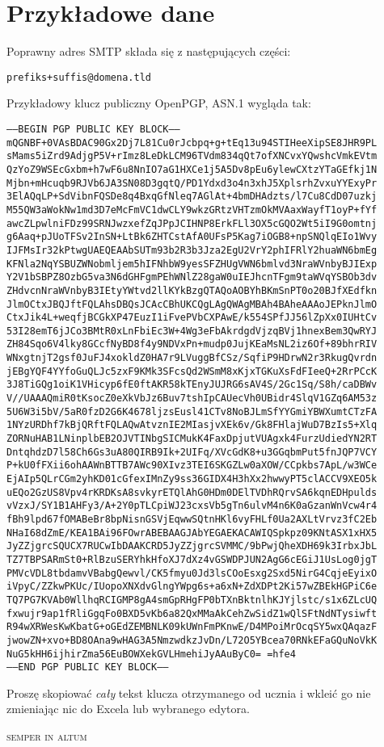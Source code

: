 \section{Przykładowe dane}

Poprawny adres SMTP składa się z następujących części:
\begin{center}\texttt{prefiks+suffis@domena.tld}\end{center}

\noindent Przykładowy klucz publiczny OpenPGP, ASN.1 wygląda tak:
\begin{center}\tiny
\texttt{-----BEGIN PGP PUBLIC KEY BLOCK-----\\
mQGNBF+0VAsBDAC90Gx2Dj7L81Cu0rJcbpq+g+tEq13u94STIHeeXipSE8JHR9PL
sMams5iZrd9AdjgP5V+rImz8LeDkLCM96TVdm834qQt7ofXNCvxYQwshcVmkEVtm
QzYoZ9WSEcGxbm+h7wF6u8NnIO7aG1HXCe1j5A5Dv8pEu6ylewCXtzYTaGEfkj1N
Mjbn+mHcuqb9RJVb6JA3SN08D3gqtQ/PD1Ydxd3o4n3xhJ5XplsrhZvxuYYExyPr
3ElAQqLP+SdVibnFQSDe8q4BxqGfNleq7AGlAt+4bmDHAdzts/l7Cu8CdD07uzkj
M55QW3aWokNw1md3D7eMcFmVC1dwCLY9wkzGRtzVHTzmOkMVAaxWayfT1oyP+fYf
awcZLpwlniFDz99SRNJwzxefZqJPpJCIHNP8ErkFLl3OX5cGQO2Wt5iI9G0omtnj
g6Aaq+pJUoTFSv2InSN+LtBk6ZHTCstAfA0UFsP5Kag7iOGB8+npSNQlqEIo1Wvy
IJFMsIr32kPtwgUAEQEAAbSUTm93b2R3b3Jza2EgU2VrY2phIFRlY2huaWN6bmEg
KFNla2NqYSBUZWNobmljem5hIFNhbW9yesSFZHUgVWN6bmlvd3NraWVnbyBJIExp
Y2V1bSBPZ8OzbG5va3N6dGHFgmPEhWNlZ28gaW0uIEJhcnTFgm9taWVqYSBOb3dv
ZHdvcnNraWVnbyB3IEtyYWtvd2llKYkBzgQTAQoAOBYhBKmSnPT0o20BJfXEdfkn
JlmOCtxJBQJftFQLAhsDBQsJCAcCBhUKCQgLAgQWAgMBAh4BAheAAAoJEPknJlmO
CtxJik4L+weqfjBCGkXP47EuzI1iFvePVbCXPAwE/k554SPfJJ56lZpXx0IUHtCv
53I28emT6jJCo3BMtR0xLnFbiEc3W+4Wg3eFbAkrdgdVjzqBVj1hnexBem3QwRYJ
ZH84Sqo6V4lky8GCcfNyBD8f4y9NDVxPn+mudp0JujKEaMsNL2iz6Of+89bhrRIV
WNxgtnjT2gsf0JuFJ4xokldZ0HA7r9LVuggBfCSz/SqfiP9HDrwN2r3RkugQvrdn
jEBgYQF4YYfoGuQLJc5zxF9KMk3SFcsQd2WSmM8xKjxTGKuXsFdFIeeQ+2RrPCcK
3J8TiGQg1oiK1VHicyp6fE0ftAKR58kTEnyJUJRG6sAV4S/2Gc1Sq/S8h/caDBWv
V//UAAAQmiR0tKsocZ0eXkVbJz6Buv7tshIpCAUecVh0UBidr4SlqV1GZq6AM53z
5U6W3i5bV/5aR0fzD2G6K4678ljzsEusl41CTv8NoBJLmSfYYGmiYBWXumtCTzFA
1NYzURDhf7kBjQRftFQLAQwAtvznIE2MIasjvXEk6v/Gk8FHlajWuD7BzIs5+Xlq
ZORNuHAB1LNinplbEB2OJVTINbgSICMukK4FaxDpjutVUAgxk4FurzUdiedYN2RT
DntqhdzD7l58Ch6Gs3uA80QIRB9Ik+2UIFq/XVcGdK8+u3GGqbmPut5fnJQP7VCY
P+kU0fFXii6ohAAWnBTTB7AWc90XIvz3TEI6SKGZLw0aXOW/CCpkbs7ApL/w3WCe
EjAIp5QLrCGm2yhKD01cGfexIMnZy9ss36GIDX4H3hXx2hwwyPT5clACCV9XEO5k
uEQo2GzUS8Vpv4rKRDKsA8svkyrETQlAhG0HDm0DElTVDhRQrvSA6kqnEDHpulds
vVzxJ/SY1B1AHFy3/A+2Y0pTLCpiWJ23cxsVb5gTn6ulvM4n6K0aGzanWnVcw4r4
fBh9lpd67fOMABeBr8bpNisnGSVjEqwwSQtnHKl6vyFHLf0Ua2AXLtVrvz3fC2Eb
NHaI68dZmE/KEA1BAi96FOwrABEBAAGJAbYEGAEKACAWIQSpkpz09KNtASX1xHX5
JyZZjgrcSQUCX7RUCwIbDAAKCRD5JyZZjgrcSVMMC/9bPwjQheXDH69k3IrbxJbL
TZ7TBPSARmSt0+RlBzuSERYhkHfoXJ7dXz4vGSWDPJUN2AgG6cEGiJ1UsLog0jgT
PMVcVDL8tbdamvVBabgQewvl/CK5fmyu0Jd3lsCOoEsxg2Sxd5NirG4CqjeEyixO
iVpyC/ZZkwPKUc/IUopoXNXdvGlngYWpg6s+a6xN+ZdXDPt2Ki57wZBEkHGPiC6e
TQ7PG7KVAb0WllhqRCIGMP8gA4smGpRHgFP0bTXnBktnlhKJYjlstc/s1x6ZLcUQ
fxwujr9ap1fRliGgqFo0BXD5vKb6a82QxMMaAkCehZwSidZ1wQlSFtNdNTysiwft
R94wXRWesKwKbatG+oGEdZEMBNLK09kUWnFmPKnwE/D4MPoiMrOcqSY5wxQAqazF
jwowZN+xvo+BD8OAna9wHAG3A5NmzwdkzJvDn/L72O5YBcea70RNkEFaGQuNoVkK
NuG5kHH6ijhirZma56EuBOWXekGVLHmehiJyAAuByC0=
=hfe4\\
-----END PGP PUBLIC KEY BLOCK-----
}\end{center}

Proszę skopiować \emph{cały} tekst klucza otrzymanego od ucznia i wkleić go nie zmieniając nic do Excela lub wybranego edytora.

\vfill
\begin{center}
\LARGE \scshape semper in altum\end{center}
\vfill
